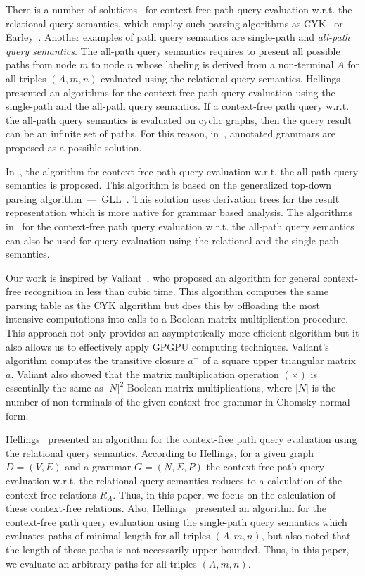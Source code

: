 \documentclass[runningheads,a4paper]{llncs}
\begin{document}
There is a number of solutions~\cite{hellingsRelational,GraphQueryWithEarley,RDF} for context-free path query evaluation w.r.t. the relational query semantics, which employ such parsing algorithms as CYK~\cite{kasami,younger} or Earley~\cite{Grune}. Another examples of path query semantics are single-path and \textit{all-path query semantics}. The all-path query semantics requires to present all possible paths from node $m$ to node $n$ whose labeling is derived from a non-terminal $A$ for all triples $(A, m, n)$ evaluated using the relational query semantics. Hellings~\cite{hellingsPathQuerying} presented an algorithms for the context-free path query evaluation using the single-path and the all-path query semantics. If a context-free path query w.r.t. the all-path query semantics is evaluated on cyclic graphs, then the query result can be an infinite set of paths. For this reason, in~\cite{hellingsPathQuerying}, annotated grammars are proposed as a possible solution.

In~\cite{GLL}, the algorithm for context-free path query evaluation w.r.t. the all-path query semantics is proposed. This algorithm is based on the generalized top-down parsing algorithm~---~GLL~\cite{scott2010gll}. This solution uses derivation trees for the result representation which is more native for grammar based analysis. The algorithms in~\cite{GLL,hellingsPathQuerying} for the context-free path query evaluation w.r.t. the all-path query semantics can also be used for query evaluation using the relational and the single-path semantics.

Our work is inspired by Valiant~\cite{valiant}, who proposed an algorithm for general context-free recognition in less than cubic time. This algorithm computes the same parsing table as the CYK algorithm but does this by offloading the most intensive computations into calls to a Boolean matrix multiplication procedure. This approach not only provides an asymptotically more efficient algorithm but it also allows us to effectively apply GPGPU computing techniques. Valiant's algorithm computes the transitive closure $a^+$ of a square upper triangular matrix $a$. Valiant also showed that the matrix multiplication operation $(\times)$ is essentially the same as $|N|^2$ Boolean matrix multiplications, where $|N|$ is the number of non-terminals of the given context-free grammar in Chomsky normal form.

Hellings~\cite{hellingsRelational} presented an algorithm for the context-free path query evaluation using the relational query semantics. According to Hellings, for a given graph $D = (V, E)$ and a grammar $G = (N, \Sigma, P)$ the context-free path query evaluation w.r.t. the relational query semantics reduces to a calculation of the context-free relations $R_A$. Thus, in this paper, we focus on the calculation of these context-free relations. Also, Hellings~\cite{hellingsRelational} presented an algorithm for the context-free path query evaluation using the single-path query semantics which evaluates paths of minimal length for all triples $(A,m,n)$, but also noted that the length of these paths is not necessarily upper bounded. Thus, in this paper, we evaluate an arbitrary paths for all triples $(A,m,n)$.
\end{document}
